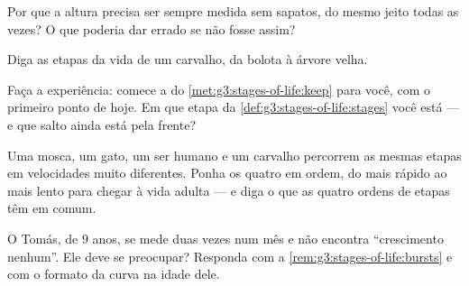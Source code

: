 \begin{exercise}[$\star$]\label{exo:g3:stages-of-life:6}
Por que a altura precisa ser sempre medida sem sapatos, do mesmo
jeito todas as vezes? O que poderia dar errado se não fosse assim?
\end{exercise}

\begin{exercise}[$\star$]\label{exo:g3:stages-of-life:7}
Diga as etapas da vida de um carvalho, da bolota à árvore velha.
\end{exercise}

\begin{exercise}[$\star$]\label{exo:g3:stages-of-life:8}
Faça a experiência: comece a  do
\cref{met:g3:stages-of-life:keep} para você, com o primeiro ponto de
hoje. Em que etapa da \cref{def:g3:stages-of-life:stages} você está
--- e que salto ainda está pela frente?
\end{exercise}

\begin{exercise}[$\star\star$]\label{exo:g3:stages-of-life:9}
Uma mosca, um gato, um ser humano e um carvalho percorrem as mesmas
etapas em velocidades muito diferentes. Ponha os quatro em ordem, do
mais rápido ao mais lento para chegar à vida adulta --- e diga o que
as quatro ordens de etapas têm em comum.
\end{exercise}

\begin{exercise}[$\star\star$]\label{exo:g3:stages-of-life:10}
O Tomás, de $9$ anos, se mede duas vezes num mês e não encontra
``crescimento nenhum''. Ele deve se preocupar? Responda com a
\cref{rem:g3:stages-of-life:bursts} e com o formato da curva na
idade dele.
\end{exercise}
